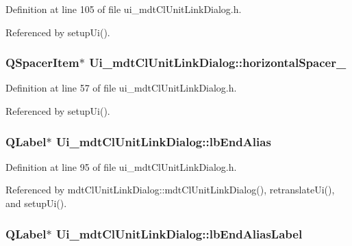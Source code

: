 Definition at line 105 of file ui\-\_\-mdt\-Cl\-Unit\-Link\-Dialog.\-h.



Referenced by setup\-Ui().

\hypertarget{class_ui__mdt_cl_unit_link_dialog_af0a01b6d7829c2312014e64e1f8c8df8}{
\subsubsection[{horizontal\-Spacer\-\_\-5}]{\setlength{\rightskip}{0pt plus 5cm}Q\-Spacer\-Item$\ast$ Ui\-\_\-mdt\-Cl\-Unit\-Link\-Dialog\-::horizontal\-Spacer\-\_}}\label{class_ui__mdt_cl_unit_link_dialog_af0a01b6d7829c2312014e64e1f8c8df8}


Definition at line 57 of file ui\-\_\-mdt\-Cl\-Unit\-Link\-Dialog.\-h.



Referenced by setup\-Ui().

\hypertarget{class_ui__mdt_cl_unit_link_dialog_a48451594b62653e9e971b4f914b01c03}{
\subsubsection[{lb\-End\-Alias}]{\setlength{\rightskip}{0pt plus 5cm}Q\-Label$\ast$ Ui\-\_\-mdt\-Cl\-Unit\-Link\-Dialog\-::lb\-End\-Alias}}\label{class_ui__mdt_cl_unit_link_dialog_a48451594b62653e9e971b4f914b01c03}


Definition at line 95 of file ui\-\_\-mdt\-Cl\-Unit\-Link\-Dialog.\-h.



Referenced by mdt\-Cl\-Unit\-Link\-Dialog\-::mdt\-Cl\-Unit\-Link\-Dialog(), retranslate\-Ui(), and setup\-Ui().

\hypertarget{class_ui__mdt_cl_unit_link_dialog_ae81ebd01898411658d617b8521177204}{
\subsubsection[{lb\-End\-Alias\-Label}]{\setlength{\rightskip}{0pt plus 5cm}Q\-Label$\ast$ Ui\-\_\-mdt\-Cl\-Unit\-Link\-Dialog\-::lb\-End\-Alias\-Label}}\label{class_ui__mdt_cl_unit_link_dialog_ae81ebd01898411658d617b8521177204}


